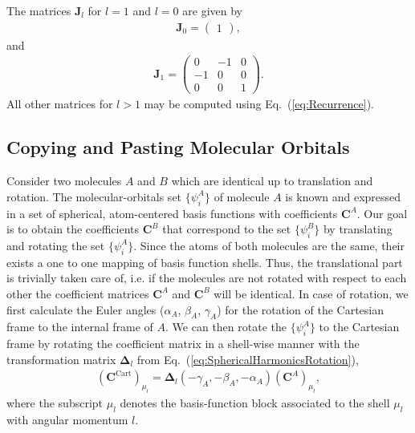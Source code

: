 The matrices $\pmb{J}_{l}$ for $l=1$ and $l=0$ are given by
\begin{align}
  \pmb{J}_{0} = \begin{pmatrix}
                    1
                  \end{pmatrix},
\end{align}
and
\begin{align}
  \pmb{J}_{1} = \begin{pmatrix}
                  0 & -1 & 0 \\
                  -1&  0 & 0 \\
                  0 &  0 & 1
                \end{pmatrix}.
\end{align}
All other matrices for $l > 1$ may be computed using Eq.~(\ref{eq:Recurrence}).

\subsection{Copying and Pasting Molecular Orbitals}

Consider two molecules $A$ and $B$ which are identical up to translation and rotation. The molecular-orbitals set
$\{\psi^{A}_i\}$ of molecule $A$ is known and expressed in a set of spherical, atom-centered basis functions with
coefficients $\pmb{C}^A$. Our goal is to obtain the coefficients $\pmb{C}^B$ that correspond to the set
$\{\psi^{B}_i\}$ by translating and rotating the set $\{\psi^{A}_i\}$. Since the atoms of both molecules are the same,
their exists a one to one mapping of basis function shells. Thus, the translational part is trivially taken care of,
i.e. if the molecules are not rotated with respect to each other the coefficient matrices $\pmb{C}^A$ and
$\pmb{C}^B$ will be identical. In case of rotation, we first calculate the Euler angles ($\alpha_A$, $\beta_A$,
$\gamma_A$) for the rotation of the Cartesian frame to the internal frame of $A$. We can then rotate the
$\{\psi^{A}_i\}$ to the Cartesian frame by rotating the coefficient matrix in a shell-wise manner with the
transformation matrix $\pmb{\Delta}_l$ from Eq.~(\ref{eq:SphericalHarmonicsRotation}),
\begin{align}
  \left(\pmb{C}^\mathrm{Cart}\right)_{\mu_l} = \pmb{\Delta}_l(-\gamma_A,-\beta_A,-\alpha_A)\left(\pmb{C}^A\right)_{\mu_l},
\end{align}
where the subscript ${\mu_l}$ denotes the basis-function block associated to the shell $\mu_l$ with
angular momentum $l$.


